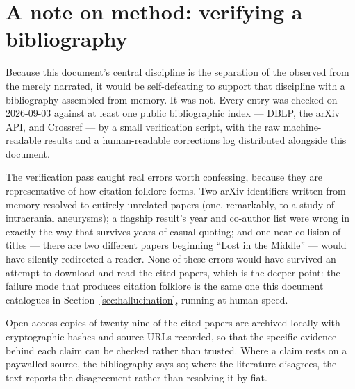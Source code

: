 \documentclass[11pt,a4paper]{article}
\begin{document}
\printbibliography

\appendix
\section{A note on method: verifying a bibliography}
\label{sec:verification}

Because this document's central discipline is the separation of the
observed from the merely narrated, it would be self-defeating to support
that discipline with a bibliography assembled from memory. It was not.
Every entry was checked on 2026-09-03 against at least one public
bibliographic index --- DBLP, the arXiv API, and Crossref --- by a small
verification script, with the raw machine-readable results and a
human-readable corrections log distributed alongside this document.

The verification pass caught real errors worth confessing, because they are
representative of how citation folklore forms. Two arXiv identifiers written
from memory resolved to entirely unrelated papers (one, remarkably, to a
study of intracranial aneurysms); a flagship result's year and co-author
list were wrong in exactly the way that survives years of casual quoting;
and one near-collision of titles --- there are two different papers beginning
``Lost in the Middle'' --- would have silently redirected a reader. None of
these errors would have survived an attempt to download and read the cited
papers, which is the deeper point: the failure mode that produces citation
folklore is the same one this document catalogues in
Section~\ref{sec:hallucination}, running at human speed.

Open-access copies of twenty-nine of the cited papers are archived locally
with cryptographic hashes and source URLs recorded, so that the specific
evidence behind each claim can be checked rather than trusted. Where a claim
rests on a paywalled source, the bibliography says so; where the literature
disagrees, the text reports the disagreement rather than resolving it by
fiat.
\end{document}
